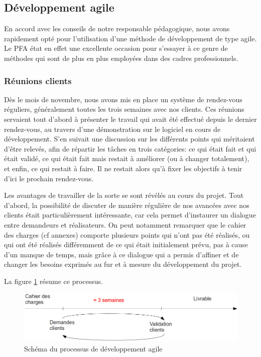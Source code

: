 \documentclass[a4paper,11pt]{article}
\begin{document}
\subsection{Développement agile}

En accord avec les conseils de notre responsable pédagogique, nous avons rapidement opté pour l'utilisation d'une méthode de développement de type agile. Le PFA état en effet une excellente occasion pour s'essayer à ce genre de méthodes qui sont de plus en plus employées dans des cadres professionnels.

\subsubsection{Réunions clients}

Dès le mois de novembre, nous avons mis en place un système de rendez-vous réguliers, généralement toutes les trois semaines avec nos clients. Ces réunions servaient tout d'abord à présenter le travail qui avait été effectué depuis le dernier rendez-vous, au travers d'une démonstration sur le logiciel en cours de développement. S'en suivait une discussion sur les différents points qui méritaient d'être relevés, afin de répartir les tâches en trois catégories: ce qui était fait et qui était validé, ce qui était fait mais restait à améliorer (ou à changer totalement), et enfin, ce qui restait à faire. Il ne restait alors qu'à fixer les objectifs à tenir d'ici le prochain rendez-vous.

Les avantages de travailler de la sorte se sont révélés au cours du projet. Tout d'abord, la possibilité de discuter de manière régulière de nos avancées avec nos clients était particulièrement intéressante, car cela permet d'instaurer un dialogue entre demandeurs et réalisateurs. On peut notamment remarquer que le cahier des charges (cf annexes) comporte plusieurs points qui n'ont pas été réalisés, ou qui ont été réalisés différemment de ce qui était initialement prévu, pas à cause d'un manque de temps, mais grâce à ce dialogue qui a permis d'affiner et de changer les besoins exprimés au fur et à mesure du développement du projet.

La figure \ref{agile} résume ce processus.

\begin{figure}[H]
\begin{center}
\includegraphics[width=450px]{methode_agile.png}
\caption{Schéma du processus de développement agile}
\label{agile}
\end{center}
\end{figure}
\end{document}
